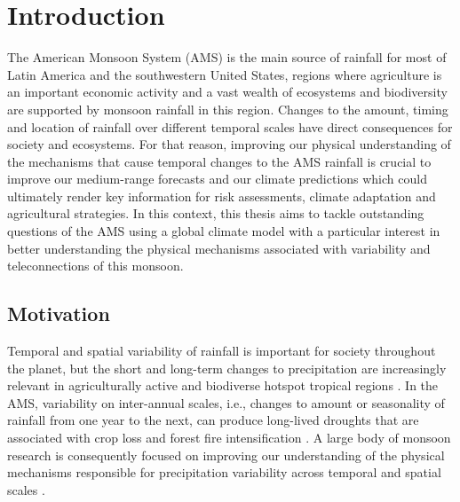 

\chapter{\label{ch:1-intro}Introduction} 


The American Monsoon System (AMS) is the main source of rainfall for most of
Latin America and the southwestern United States, regions where agriculture is an important economic activity and a vast wealth of ecosystems and biodiversity are
supported by monsoon rainfall in this region. Changes to the amount, timing and location of rainfall over different temporal scales
have direct consequences for society and ecosystems.
For that reason, improving our physical understanding of the mechanisms that cause temporal changes to the AMS rainfall is crucial to improve our medium-range forecasts and our climate predictions which could ultimately render key information for risk assessments, climate adaptation and
agricultural strategies. In this context, this thesis aims to tackle outstanding questions of the AMS using a global climate model with a particular interest in better understanding
the physical mechanisms associated with variability and teleconnections of this monsoon.


\section{Motivation}

Temporal and spatial variability of rainfall is important for society throughout the planet, but the short and long-term changes to precipitation are increasingly relevant in agriculturally active and biodiverse hotspot tropical regions \citep{sultan2005,jain2015}. 
In the AMS, variability on inter-annual scales, i.e., changes to amount or seasonality of rainfall from one year to the next, can produce long-lived droughts that are associated with crop loss and forest fire intensification \citep{chen2009,harvey2018}.
A large body of monsoon research is consequently focused on improving our understanding of the physical mechanisms responsible for precipitation variability across temporal and spatial scales \citep{wang2017,gadgil2018}. 

